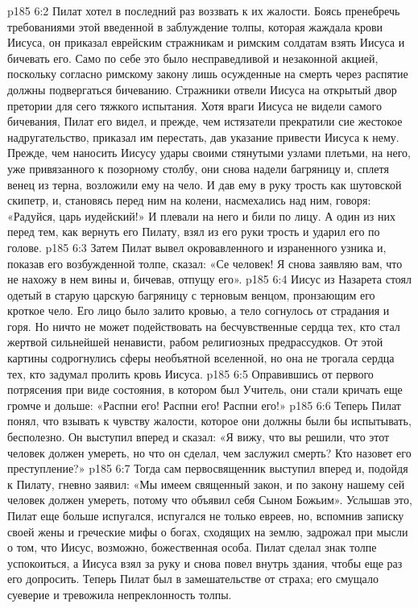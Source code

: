 \vs p185 6:2 Пилат хотел в последний раз воззвать к их жалости. Боясь пренебречь требованиями этой введенной в заблуждение толпы, которая жаждала крови Иисуса, он приказал еврейским стражникам и римским солдатам взять Иисуса и бичевать его. Само по себе это было несправедливой и незаконной акцией, поскольку согласно римскому закону лишь осужденные на смерть через распятие должны подвергаться бичеванию. Стражники отвели Иисуса на открытый двор претории для сего тяжкого испытания. Хотя враги Иисуса не видели самого бичевания, Пилат его видел, и прежде, чем истязатели прекратили сие жестокое надругательство, приказал им перестать, дав указание привести Иисуса к нему. Прежде, чем наносить Иисусу удары своими стянутыми узлами плетьми, на него, уже привязанного к позорному столбу, они снова надели багряницу и, сплетя венец из терна, возложили ему на чело. И дав ему в руку трость как шутовской скипетр, и, становясь перед ним на колени, насмехались над ним, говоря: «Радуйся, царь иудейский!» И плевали на него и били по лицу. А один из них перед тем, как вернуть его Пилату, взял из его руки трость и ударил его по голове.
\vs p185 6:3 Затем Пилат вывел окровавленного и израненного узника и, показав его возбужденной толпе, сказал: «Се человек! Я снова заявляю вам, что не нахожу в нем вины и, бичевав, отпущу его».
\vs p185 6:4 Иисус из Назарета стоял одетый в старую царскую багряницу с терновым венцом, пронзающим его кроткое чело. Его лицо было залито кровью, а тело согнулось от страдания и горя. Но ничто не может подействовать на бесчувственные сердца тех, кто стал жертвой сильнейшей ненависти, рабом религиозных предрассудков. От этой картины содрогнулись сферы необъятной вселенной, но она не трогала сердца тех, кто задумал пролить кровь Иисуса.
\vs p185 6:5 Оправившись от первого потрясения при виде состояния, в котором был Учитель, они стали кричать еще громче и дольше: «Распни его! Распни его! Распни его!»
\vs p185 6:6 Теперь Пилат понял, что взывать к чувству жалости, которое они должны были бы испытывать, бесполезно. Он выступил вперед и сказал: «Я вижу, что вы решили, что этот человек должен умереть, но что он сделал, чем заслужил смерть? Кто назовет его преступление?»
\vs p185 6:7 Тогда сам первосвященник выступил вперед и, подойдя к Пилату, гневно заявил: «Мы имеем священный закон, и по закону нашему сей человек должен умереть, потому что объявил себя Сыном Божьим». Услышав это, Пилат еще больше испугался, испугался не только евреев, но, вспомнив записку своей жены и греческие мифы о богах, сходящих на землю, задрожал при мысли о том, что Иисус, возможно, божественная особа. Пилат сделал знак толпе успокоиться, а Иисуса взял за руку и снова повел внутрь здания, чтобы еще раз его допросить. Теперь Пилат был в замешательстве от страха; его смущало суеверие и тревожила непреклонность толпы.
